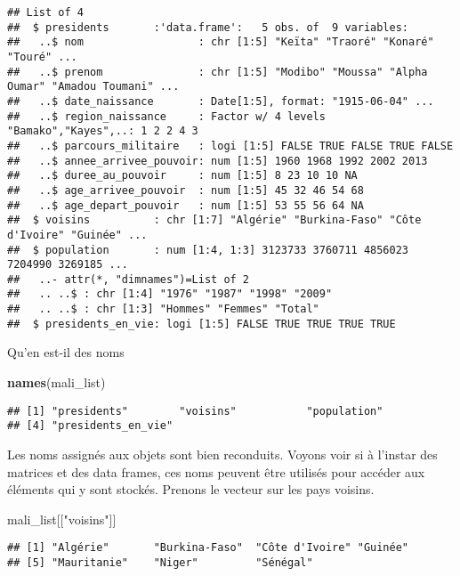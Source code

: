 \documentclass[]{book}
\newenvironment{Shaded}{\begin{snugshade}}{\end{snugshade}}
\newcommand{\KeywordTok}[1]{\textcolor[rgb]{0.13,0.29,0.53}{\textbf{#1}}}
\newcommand{\StringTok}[1]{\textcolor[rgb]{0.31,0.60,0.02}{#1}}
\newcommand{\NormalTok}[1]{#1}
\begin{document}
\begin{verbatim}
## List of 4
##  $ presidents       :'data.frame':   5 obs. of  9 variables:
##   ..$ nom                  : chr [1:5] "Keïta" "Traoré" "Konaré" "Touré" ...
##   ..$ prenom               : chr [1:5] "Modibo" "Moussa" "Alpha Oumar" "Amadou Toumani" ...
##   ..$ date_naissance       : Date[1:5], format: "1915-06-04" ...
##   ..$ region_naissance     : Factor w/ 4 levels "Bamako","Kayes",..: 1 2 2 4 3
##   ..$ parcours_militaire   : logi [1:5] FALSE TRUE FALSE TRUE FALSE
##   ..$ annee_arrivee_pouvoir: num [1:5] 1960 1968 1992 2002 2013
##   ..$ duree_au_pouvoir     : num [1:5] 8 23 10 10 NA
##   ..$ age_arrivee_pouvoir  : num [1:5] 45 32 46 54 68
##   ..$ age_depart_pouvoir   : num [1:5] 53 55 56 64 NA
##  $ voisins          : chr [1:7] "Algérie" "Burkina-Faso" "Côte d'Ivoire" "Guinée" ...
##  $ population       : num [1:4, 1:3] 3123733 3760711 4856023 7204990 3269185 ...
##   ..- attr(*, "dimnames")=List of 2
##   .. ..$ : chr [1:4] "1976" "1987" "1998" "2009"
##   .. ..$ : chr [1:3] "Hommes" "Femmes" "Total"
##  $ presidents_en_vie: logi [1:5] FALSE TRUE TRUE TRUE TRUE
\end{verbatim}

Qu'en est-il des noms

\begin{Shaded}
\begin{Highlighting}[]
\KeywordTok{names}\NormalTok{(mali_list)}
\end{Highlighting}
\end{Shaded}

\begin{verbatim}
## [1] "presidents"        "voisins"           "population"       
## [4] "presidents_en_vie"
\end{verbatim}

Les noms assignés aux objets sont bien reconduits. Voyons voir si à
l'instar des matrices et des data frames, ces noms peuvent être utilisés
pour accéder aux éléments qui y sont stockés. Prenons le vecteur sur les
pays voisins.

\begin{Shaded}
\begin{Highlighting}[]
\NormalTok{mali_list[[}\StringTok{"voisins"}\NormalTok{]]}
\end{Highlighting}
\end{Shaded}

\begin{verbatim}
## [1] "Algérie"       "Burkina-Faso"  "Côte d'Ivoire" "Guinée"       
## [5] "Mauritanie"    "Niger"         "Sénégal"
\end{verbatim}
\end{document}
